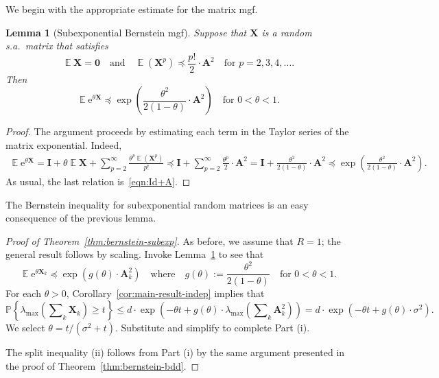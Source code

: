 \documentclass[11pt,letterpaper,twoside,reqno,draft]{amsart}
\newtheorem{lemma}[thm]{Lemma}
\theoremstyle{remark}
\numberwithin{equation}{section}
\numberwithin{thm}{section}
\begin{document}
We begin with the appropriate estimate for the matrix mgf.

\begin{lemma}[Subexponential Bernstein mgf] \label{lem:bernstein-subexp-mgf}
Suppose that ${\bm{{X}}}$ is a random s.a.~matrix that satisfies
$$
{\operatorname{\mathbb{E}}} {\bm{{X}}} = {\bm{{0}}}
\quad\text{and}\quad
{\operatorname{\mathbb{E}}}( {\bm{{X}}}^p ) {\preccurlyeq} \frac{p!}{2} \cdot {\bm{{A}}}^2
\quad\text{for $p = 2, 3, 4, \dots$.}
$$
Then
$$
{\operatorname{\mathbb{E}}} {\mathrm{e}}^{\theta {\bm{{X}}}}
	{\preccurlyeq} \exp\left( \frac{\theta^2}{2(1-\theta)} \cdot {\bm{{A}}}^2 \right)
\quad\text{for $0 < \theta < 1$.}
$$
\end{lemma}

\begin{proof}
The argument proceeds by estimating each term in the Taylor series of the matrix exponential.  Indeed,
\begin{multline*}
{\operatorname{\mathbb{E}}} {\mathrm{e}}^{\theta {\bm{{X}}}}
	= {\mathbf{I}} + \theta {\operatorname{\mathbb{E}}} {\bm{{X}}} + \sum_{p=2}^{\infty} \frac{\theta^{p} {\operatorname{\mathbb{E}}}( {\bm{{X}}}^{p} )}{p!}
	{\preccurlyeq} {\mathbf{I}} + \sum_{p=2}^{\infty} \frac{\theta^p}{2} \cdot {\bm{{A}}}^2
	= {\mathbf{I}} + \frac{\theta^2}{2(1 - \theta)} \cdot {\bm{{A}}}^2
	{\preccurlyeq} \exp\left( \frac{\theta^2}{2(1 - \theta)} \cdot {\bm{{A}}}^2 \right).
\end{multline*}
As usual, the last relation is~\eqref{eqn:Id+A}.
\end{proof}

The Bernstein inequality for subexponential random matrices is an easy consequence of the previous lemma.

\begin{proof}[Proof of Theorem~\ref{thm:bernstein-subexp}]
As before, we assume that $R = 1$; the general result follows by scaling.  Invoke Lemma~\ref{lem:bernstein-subexp-mgf} to see that
$$
{\operatorname{\mathbb{E}}} {\mathrm{e}}^{\theta {\bm{{X}}}_k}
	{\preccurlyeq} \exp\left( g(\theta) \cdot {\bm{{A}}}_k^2 \right)
\quad\text{where}\quad
g(\theta) := \frac{\theta^2}{2(1 - \theta)}
\quad\text{for $0 < \theta < 1$}.
$$
For each $\theta > 0$, Corollary~\ref{cor:main-result-indep} implies that
$$
{\mathbb{P}\left\{ {{ \lambda_{\max}\left( \sum\nolimits_k {\bm{{X}}}_k \right) \geq t }} \right\}}
	\leq d \cdot \exp\left( -\theta t + g(\theta) \cdot \lambda_{\max}\left(
	\sum\nolimits_k {\bm{{A}}}_k^2 \right) \right)
	= d \cdot \exp\left( -\theta t + g(\theta) \cdot \sigma^2 \right).
$$
We select $\theta = t/(\sigma^2 + t)$.  Substitute and simplify to complete Part (i).

The split inequality (ii) follows from Part (i) by the same argument presented in the proof of Theorem~\ref{thm:bernstein-bdd}.
\end{proof}
\end{document}
